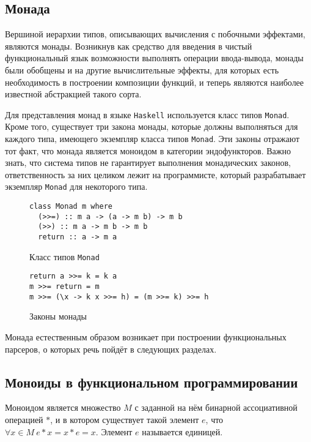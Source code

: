 \subsection{Монада}

Вершиной иерархии типов, описывающих вычисления с побочными эффектами, 
являются монады. Возникнув как средство для введения в чистый функциональный 
язык возможности выполнять операции ввода-вывода, монады были обобщены и на 
другие вычислительные эффекты, для которых есть необходимость в построении 
композиции функций, и теперь являются наиболее известной абстракцией такого 
сорта.

Для представления монад в языке \lstinline{Haskell} используется класс типов 
\lstinline{Monad}. Кроме того, существует три закона монады, которые должны 
выполняться для каждого типа, имеющего экземпляр класса типов \lstinline{Monad}.
Эти законы отражают тот факт, что монада является моноидом в категории 
эндофункторов. Важно знать, что система типов не гарантирует выполнения 
монадических законов, ответственность за них целиком лежит на программисте, 
который разрабатывает экземпляр \lstinline{Monad} для некоторого типа.

\begin{figure}[h]
\begin{lstlisting}
class Monad m where
  (>>=) :: m a -> (a -> m b) -> m b
  (>>) :: m a -> m b -> m b
  return :: a -> m a
\end{lstlisting}
\caption{Класс типов \lstinline{Monad}}
\label{listing:Monad}
\end{figure}

\begin{figure}[h]
\begin{lstlisting}
return a >>= k = k a
m >>= return = m
m >>= (\x -> k x >>= h) = (m >>= k) >>= h
\end{lstlisting}
\caption{Законы монады}
\label{listing:MonadLaws}
\end{figure}

Монада естественным образом возникает при построении функциональных парсеров, 
о которых речь пойдёт в следующих разделах.

\subsection{Моноиды в функциональном программировании}

Моноидом является множество $M$ с заданной на нём бинарной ассоциативной 
операцией $*$, и в котором существует такой элемент 
$e$, что $\forall x \in M~e*x = x*e = x$. Элемент $e$ называется единицей.

